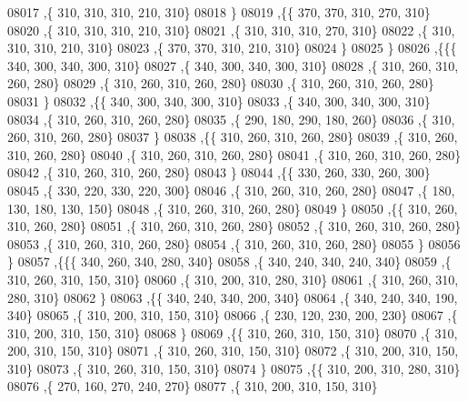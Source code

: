 \begin{DoxyCode}
08017     ,\{   310,   310,   310,   210,   310\}
08018     \}
08019    ,\{\{   370,   370,   310,   270,   310\}
08020     ,\{   310,   310,   310,   210,   310\}
08021     ,\{   310,   310,   310,   270,   310\}
08022     ,\{   310,   310,   310,   210,   310\}
08023     ,\{   370,   370,   310,   210,   310\}
08024     \}
08025    \}
08026   ,\{\{\{   340,   300,   340,   300,   310\}
08027     ,\{   340,   300,   340,   300,   310\}
08028     ,\{   310,   260,   310,   260,   280\}
08029     ,\{   310,   260,   310,   260,   280\}
08030     ,\{   310,   260,   310,   260,   280\}
08031     \}
08032    ,\{\{   340,   300,   340,   300,   310\}
08033     ,\{   340,   300,   340,   300,   310\}
08034     ,\{   310,   260,   310,   260,   280\}
08035     ,\{   290,   180,   290,   180,   260\}
08036     ,\{   310,   260,   310,   260,   280\}
08037     \}
08038    ,\{\{   310,   260,   310,   260,   280\}
08039     ,\{   310,   260,   310,   260,   280\}
08040     ,\{   310,   260,   310,   260,   280\}
08041     ,\{   310,   260,   310,   260,   280\}
08042     ,\{   310,   260,   310,   260,   280\}
08043     \}
08044    ,\{\{   330,   260,   330,   260,   300\}
08045     ,\{   330,   220,   330,   220,   300\}
08046     ,\{   310,   260,   310,   260,   280\}
08047     ,\{   180,   130,   180,   130,   150\}
08048     ,\{   310,   260,   310,   260,   280\}
08049     \}
08050    ,\{\{   310,   260,   310,   260,   280\}
08051     ,\{   310,   260,   310,   260,   280\}
08052     ,\{   310,   260,   310,   260,   280\}
08053     ,\{   310,   260,   310,   260,   280\}
08054     ,\{   310,   260,   310,   260,   280\}
08055     \}
08056    \}
08057   ,\{\{\{   340,   260,   340,   280,   340\}
08058     ,\{   340,   240,   340,   240,   340\}
08059     ,\{   310,   260,   310,   150,   310\}
08060     ,\{   310,   200,   310,   280,   310\}
08061     ,\{   310,   260,   310,   280,   310\}
08062     \}
08063    ,\{\{   340,   240,   340,   200,   340\}
08064     ,\{   340,   240,   340,   190,   340\}
08065     ,\{   310,   200,   310,   150,   310\}
08066     ,\{   230,   120,   230,   200,   230\}
08067     ,\{   310,   200,   310,   150,   310\}
08068     \}
08069    ,\{\{   310,   260,   310,   150,   310\}
08070     ,\{   310,   200,   310,   150,   310\}
08071     ,\{   310,   260,   310,   150,   310\}
08072     ,\{   310,   200,   310,   150,   310\}
08073     ,\{   310,   260,   310,   150,   310\}
08074     \}
08075    ,\{\{   310,   200,   310,   280,   310\}
08076     ,\{   270,   160,   270,   240,   270\}
08077     ,\{   310,   200,   310,   150,   310\}

\end{DoxyCode}

